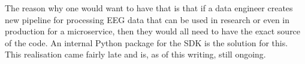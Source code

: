 The reason why one would want to have that is that if a data engineer creates new pipeline for processing EEG data that can be used in research or even in production for a microservice, then they would all need to have the exact source of the code. An internal Python package for the SDK is the solution for this. This realisation came fairly late and is, as of this writing, still ongoing.
